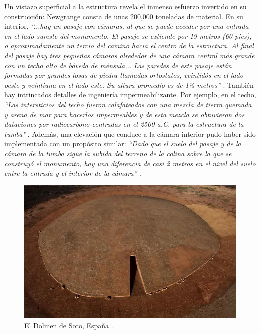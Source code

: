 \documentclass[10pt,twocolumn,letterpaper]{article}
\begin{document}
Un vistazo superficial a la estructura revela el inmenso esfuerzo invertido en su construcción: Newgrange consta de unas 200,000 toneladas de material. En su interior, \textit{“...hay un pasaje con cámaras, al que se puede acceder por una entrada en el lado sureste del monumento. El pasaje se extiende por 19 metros (60 pies), o aproximadamente un tercio del camino hacia el centro de la estructura. Al final del pasaje hay tres pequeñas cámaras alrededor de una cámara central más grande con un techo alto de bóveda de ménsula... Las paredes de este pasaje están formadas por grandes losas de piedra llamadas ortostatos, veintidós en el lado oeste y veintiuna en el lado este. Su altura promedio es de 1½ metros”} \cite{70}. También hay intrincados detalles de ingeniería impermeabilizante. Por ejemplo, en el techo, \textit{“Las intersticios del techo fueron calafateados con una mezcla de tierra quemada y arena de mar para hacerlos impermeables y de esta mezcla se obtuvieron dos dataciones por radiocarbono centradas en el 2500 a.C. para la estructura de la tumba"} \cite{71}. Además, una elevación que conduce a la cámara interior pudo haber sido implementada con un propósito similar: \textit{“Dado que el suelo del pasaje y de la cámara de la tumba sigue la subida del terreno de la colina sobre la que se construyó el monumento, hay una diferencia de casi 2 metros en el nivel del suelo entre la entrada y el interior de la cámara”} \cite{71}.

\begin{figure}[b]
\begin{center}
   \includegraphics[width=1\linewidth]{dolmen.jpg}
\end{center}
   \caption{El Dolmen de Soto, España \cite{53}.}
\label{fig:9}
\label{fig:onecol}
\end{figure}
\end{document}

